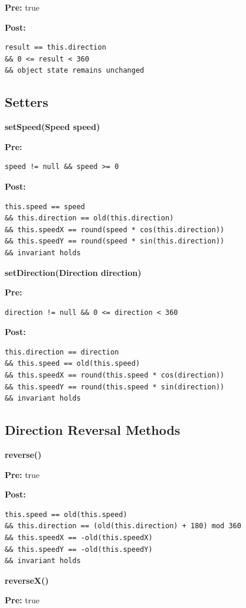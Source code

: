 \textbf{Pre:} true

\textbf{Post:}
\begin{verbatim}
result == this.direction
&& 0 <= result < 360
&& object state remains unchanged
\end{verbatim}

\subsection*{Setters}

\textbf{setSpeed(Speed speed)}

\textbf{Pre:}
\begin{verbatim}
speed != null && speed >= 0
\end{verbatim}

\textbf{Post:}
\begin{verbatim}
this.speed == speed
&& this.direction == old(this.direction)
&& this.speedX == round(speed * cos(this.direction))
&& this.speedY == round(speed * sin(this.direction))
&& invariant holds
\end{verbatim}

\textbf{setDirection(Direction direction)}

\textbf{Pre:}
\begin{verbatim}
direction != null && 0 <= direction < 360
\end{verbatim}

\textbf{Post:}
\begin{verbatim}
this.direction == direction
&& this.speed == old(this.speed)
&& this.speedX == round(this.speed * cos(direction))
&& this.speedY == round(this.speed * sin(direction))
&& invariant holds
\end{verbatim}

\subsection*{Direction Reversal Methods}

\textbf{reverse()}

\textbf{Pre:} true

\textbf{Post:}
\begin{verbatim}
this.speed == old(this.speed)
&& this.direction == (old(this.direction) + 180) mod 360
&& this.speedX == -old(this.speedX)
&& this.speedY == -old(this.speedY)
&& invariant holds
\end{verbatim}

\textbf{reverseX()}

\textbf{Pre:} true

